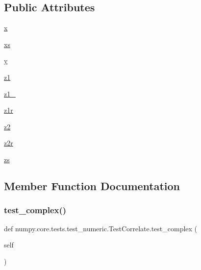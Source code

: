 \subsection*{Public Attributes}
\begin{DoxyCompactItemize}
\item 
\hyperlink{classnumpy_1_1core_1_1tests_1_1test__numeric_1_1TestCorrelate_adbbd677bbb8ef8cc69e53930cec863a7}{x}
\item 
\hyperlink{classnumpy_1_1core_1_1tests_1_1test__numeric_1_1TestCorrelate_af4f73f08efef53f96b3f912155bcc3b2}{xs}
\item 
\hyperlink{classnumpy_1_1core_1_1tests_1_1test__numeric_1_1TestCorrelate_a11afa2d93df3ca659433279dee3d3590}{y}
\item 
\hyperlink{classnumpy_1_1core_1_1tests_1_1test__numeric_1_1TestCorrelate_a4971ef5c015baa023b7e91e4350aa985}{z1}
\item 
\hyperlink{classnumpy_1_1core_1_1tests_1_1test__numeric_1_1TestCorrelate_a69c364bd32971b069e4a5b050e22af97}{z1\+\_}
\item 
\hyperlink{classnumpy_1_1core_1_1tests_1_1test__numeric_1_1TestCorrelate_a068a435b37ba565d54ec05b913193423}{z1r}
\item 
\hyperlink{classnumpy_1_1core_1_1tests_1_1test__numeric_1_1TestCorrelate_a92ceff58dbb63453cd0381ae616790bc}{z2}
\item 
\hyperlink{classnumpy_1_1core_1_1tests_1_1test__numeric_1_1TestCorrelate_a0b2aa0d160f933687a22929263e732ac}{z2r}
\item 
\hyperlink{classnumpy_1_1core_1_1tests_1_1test__numeric_1_1TestCorrelate_a6d469fd84e4122f62a764b6d2fa9c390}{zs}
\end{DoxyCompactItemize}


\subsection{Member Function Documentation}
\mbox{\label{classnumpy_1_1core_1_1tests_1_1test__numeric_1_1TestCorrelate_a9df6a9cbb2d61c5dfe9ffe8973554aed}} 
\subsubsection{\texorpdfstring{test\+\_\+complex()}{test\_complex()}}
{\footnotesize\ttfamily def numpy.\+core.\+tests.\+test\+\_\+numeric.\+Test\+Correlate.\+test\+\_\+complex (\begin{DoxyParamCaption}\item[{}]{self }\end{DoxyParamCaption})}


